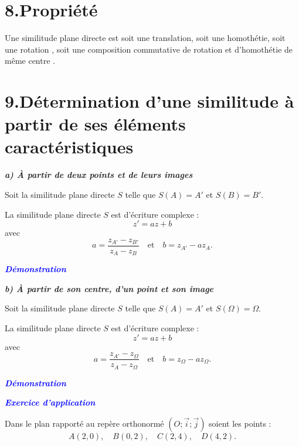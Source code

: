 \documentclass[12pt,a4paper]{article}
\begin{document}
\section*{8.Propriété}

Une similitude plane directe est soit une translation, soit une homothétie, soit une rotation , soit une
composition commutative de rotation et d’homothétie de même centre .

\section*{9.Détermination d’une similitude à partir de ses éléments caractéristiques}

\vspace{0.3cm}

\textbf{\textit{a) À partir de deux points et de leurs images}}

\vspace{0.3cm}

Soit la similitude plane directe \( S \) telle que \quad \( S(A) = A' \) \quad et \quad \( S(B) = B' \).

\vspace{0.3cm}

La similitude plane directe \( S \) est d’écriture complexe :
\[
z' = a z + b
\]
avec 
\[
a = \frac{z_{A'} - z_{B'}}{z_A - z_B} \quad \text{et} \quad b = z_{A'} - a z_A.
\]

\textbf{\textcolor{blue}{\textit{Démonstration}}}

\textbf{\textit{b) À partir de son centre, d’un point et son image}}

\vspace{0.3cm}

Soit la similitude plane directe \( S \) telle que \quad \( S(A) = A' \) \quad et \quad \( S(\Omega) = \Omega \).

\vspace{0.3cm}

La similitude plane directe \( S \) est d’écriture complexe :
\[
z' = a z + b
\]
avec 
\[
a = \frac{z_{A'} - z_{\Omega}}{z_A - z_{\Omega}} \quad \text{et} \quad b = z_{\Omega} - a z_{\Omega}.
\]

\textbf{\textcolor{blue}{\textit{Démonstration}}}

\textbf{\textcolor{blue}{\textit{Exercice d’application}}}

Dans le plan rapporté au repère orthonormé \( (O; \vec{i}; \vec{j}) \) soient les points : 
\[
A(2,0), \quad B(0,2), \quad C(2,4), \quad D(4,2).
\]
\end{document}
